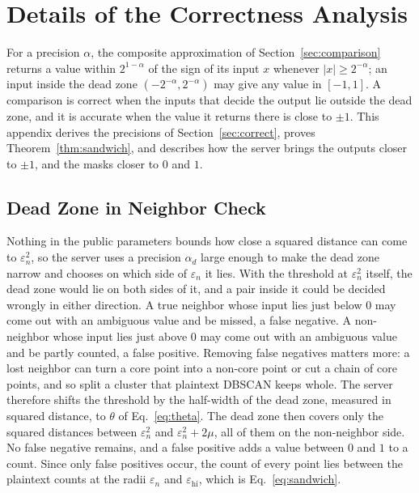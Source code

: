 
\section{Details of the Correctness Analysis}
\label{app:correct}

For a precision $\alpha$, the composite approximation of
Section~\ref{sec:comparison} returns a value within $2^{1-\alpha}$ of the
sign of its input $x$ whenever $|x| \ge 2^{-\alpha}$; an input inside the
dead zone $(-2^{-\alpha}, 2^{-\alpha})$ may give any value in $[-1,1]$.
A comparison is correct when the inputs that decide the output lie
outside the dead zone, and it is accurate when the value it returns there
is close to $\pm 1$. This appendix derives the precisions of
Section~\ref{sec:correct}, proves Theorem~\ref{thm:sandwich}, and
describes how the server brings the outputs closer to $\pm 1$, and the
masks closer to $0$ and $1$.

\subsection{Dead Zone in Neighbor Check}
\label{app:neighbor}

Nothing in the public parameters bounds how close a squared distance can
come to $\varepsilon_n^2$, so the server uses a precision $\alpha_d$
large enough to make the dead zone narrow and chooses on which side of
$\varepsilon_n$ it lies. With the threshold at $\varepsilon_n^2$ itself,
the dead zone would lie on both sides of it, and a pair inside it could
be decided wrongly in either direction. A true neighbor whose input lies
just below $0$ may come out with an ambiguous value and be missed, a false
negative. A non-neighbor whose input lies just above $0$ may come out
with an ambiguous value and be partly counted, a false positive. Removing
false negatives matters more: a lost neighbor can turn a core point into a
non-core point or cut a chain of core points, and so split a cluster that
plaintext DBSCAN keeps whole. The server therefore shifts the threshold
by the half-width of the dead zone, measured in squared distance, to
$\theta$ of Eq.~\eqref{eq:theta}. The dead zone then covers only the
squared distances between $\varepsilon_n^2$ and $\varepsilon_n^2 + 2\mu$,
all of them on the non-neighbor side. No false negative remains, and a
false positive adds a value between $0$ and $1$ to a count. Since only
false positives occur, the count of every point lies between the
plaintext counts at the radii $\varepsilon_n$ and
$\varepsilon_{\mathrm{hi}}$, which is Eq.~\eqref{eq:sandwich}.

